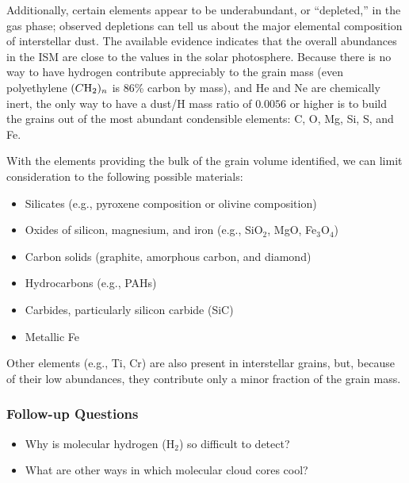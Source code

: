 \documentclass[a4paper,10pt]{article}
\begin{document}
{\noindent}Additionally, certain elements appear to be underabundant, or ``depleted,'' in the gas phase; observed depletions can tell us about the major elemental composition of interstellar dust. The available evidence indicates that the overall abundances in the ISM are close to the values in the solar photosphere. Because there is no way to have hydrogen contribute appreciably to the grain mass (even polyethylene $(C{\rm H}_2)_n$ is 86\% carbon by mass), and He and Ne are chemically inert, the only way to have a dust/H mass ratio of $0.0056$ or higher is to build the grains out of the most abundant condensible elements: C, O, Mg, Si, S, and Fe.

{\noindent}With the elements providing the bulk of the grain volume identified, we can limit consideration to the following possible materials:

\begin{itemize}
    \item Silicates (e.g., pyroxene composition or olivine composition)
    \item Oxides of silicon, magnesium, and iron (e.g., SiO$_2$, MgO, Fe$_3$O$_4$)
    \item Carbon solids (graphite, amorphous carbon, and diamond)
    \item Hydrocarbons (e.g., PAHs)
    \item Carbides, particularly silicon carbide (SiC)
    \item Metallic Fe
\end{itemize}

{\noindent}Other elements (e.g., Ti, Cr) are also present in interstellar grains, but, because of their low abundances, they contribute only a minor fraction of the grain mass.

\subsubsection{Follow-up Questions}

\begin{itemize}
    \item Why is molecular hydrogen (H$_2$) so difficult to detect?
    \item What are other ways in which molecular cloud cores cool?
\end{itemize}

\end{document}
